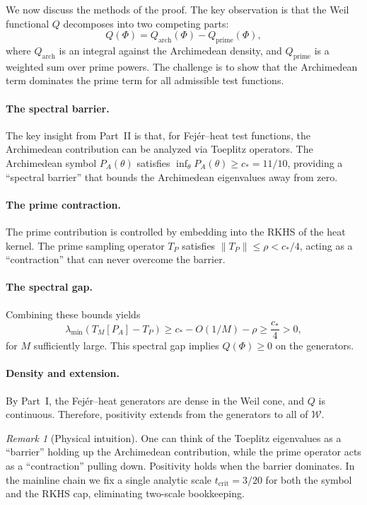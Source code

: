 \documentclass[11pt,a4paper]{article}
\theoremstyle{definition}
\theoremstyle{remark}
\newtheorem{remark}[theorem]{Remark}
\begin{document}
We now discuss the methods of the proof. The key observation is that the Weil functional $Q$ decomposes into two competing parts:
\begin{equation}\label{eq:Q-decomp}
  Q(\Phi) = Q_{\mathrm{arch}}(\Phi) - Q_{\mathrm{prime}}(\Phi),
\end{equation}
where $Q_{\mathrm{arch}}$ is an integral against the Archimedean density, and $Q_{\mathrm{prime}}$ is a weighted sum over prime powers. The challenge is to show that the Archimedean term dominates the prime term for all admissible test functions.

\paragraph{The spectral barrier.}
The key insight from Part~II is that, for Fej\'er--heat test functions, the Archimedean contribution can be analyzed via Toeplitz operators. The Archimedean symbol $P_A(\theta)$ satisfies $\inf_\theta P_A(\theta) \geq c_* = 11/10$, providing a ``spectral barrier'' that bounds the Archimedean eigenvalues away from zero.

\paragraph{The prime contraction.}
The prime contribution is controlled by embedding into the RKHS of the heat kernel. The prime sampling operator $T_P$ satisfies $\|T_P\| \leq \rho < c_*/4$, acting as a ``contraction'' that can never overcome the barrier.

\paragraph{The spectral gap.}
Combining these bounds yields
\begin{equation}\label{eq:gap}
  \lambda_{\min}(T_M[P_A] - T_P) \geq c_* - O(1/M) - \rho \geq \frac{c_*}{4} > 0,
\end{equation}
for $M$ sufficiently large. This spectral gap implies $Q(\Phi) \geq 0$ on the generators.

\paragraph{Density and extension.}
By Part~I, the Fej\'er--heat generators are dense in the Weil cone, and $Q$ is continuous. Therefore, positivity extends from the generators to all of $\mathcal{W}$.

\begin{remark}[Physical intuition]\label{rem:physics}
One can think of the Toeplitz eigenvalues as a ``barrier'' holding up the Archimedean contribution, while the prime operator acts as a ``contraction'' pulling down. Positivity holds when the barrier dominates. In the mainline chain we fix a single analytic scale $t_{\mathrm{crit}}=3/20$ for both the symbol and the RKHS cap, eliminating two-scale bookkeeping.
\end{remark}
\end{document}
